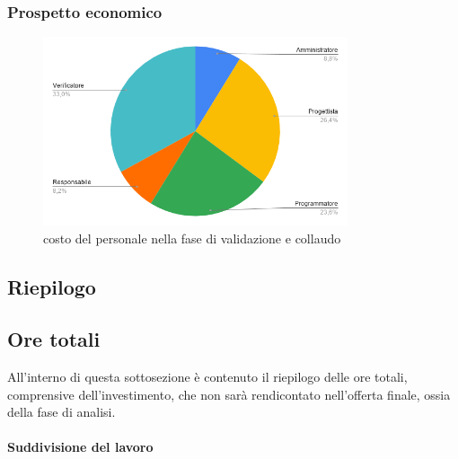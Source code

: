     \subsubsection{Prospetto economico}
    \def\salarycontent{
        {Amministratore,16,20,320},
        {Analista,0,25,0},
        {Progettista,48,22,1056},
        {Programmatore,43,15,645},
        {Responsabile,15,30,450},
        {Verificatore,60,15,900},
        {Totale,182,127,3371},
    }
    
    \begin{figure}[H]
        \centering
        \includegraphics[width=0.8\textwidth]{source/img/validazione_ruoli.png}
        \caption{costo del personale nella fase di validazione e collaudo}
    \end{figure}
\subsection{Riepilogo}
    \subsection{Ore totali}
    All'interno di questa sottosezione è contenuto il riepilogo delle ore totali, comprensive dell'investimento, che non sarà rendicontato nell'offerta finale, ossia della fase di analisi.
        \paragraph{Suddivisione del lavoro}
        
